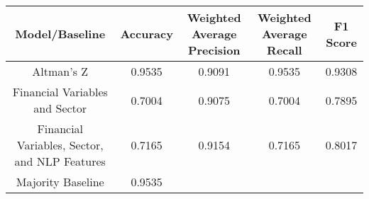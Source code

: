 \footnotesize
\begin{tabular}{ccccc}
\toprule
Model/Baseline & Accuracy & Weighted Average Precision & Weighted Average Recall & F1 Score \\
\midrule
Altman's Z & 0.9535 & 0.9091 & 0.9535 & 0.9308 \\
Financial Variables and Sector & 0.7004 & 0.9075 & 0.7004 & 0.7895 \\
Financial Variables, Sector, and NLP Features & 0.7165 & 0.9154 & 0.7165 & 0.8017 \\
Majority Baseline & 0.9535 &  &  &  \\
\bottomrule
\end{tabular}

\normalsize